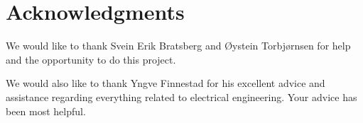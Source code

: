 \clearpage
\section*{Acknowledgments}
We would like to thank Svein Erik Bratsberg and \O ystein Torbj\o rnsen for help and the opportunity to do this project.

We would also like to thank Yngve Finnestad for his excellent advice and assistance regarding everything related to electrical engineering. Your advice has been most helpful.

